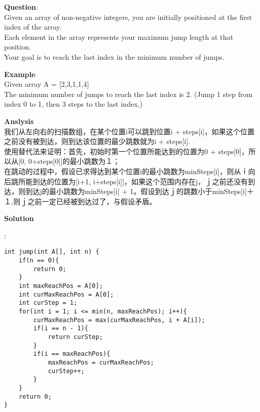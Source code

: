     
\begin{description}
    \item{\textbf{Question}}:\\%
		Given an array of non-negative integers, you are initially positioned at the first index of the array.\\
		Each element in the array represents your maximum jump length at that position.\\
		Your goal is to reach the last index in the minimum number of jumps.\\

    \item{\textbf{Example}}\\
		Given array A = [2,3,1,1,4]\\
		The minimum number of jumps to reach the last index is 2. (Jump 1 step from index 0 to 1, then 3 steps to the last index.)\\

    \item{\textbf{Anslysis}}\\
		我们从左向右的扫描数组，在某个位置i可以跳到位置i + steps[i]，如果这个位置之前没有被到达，则到达该位置的最少跳数就为i + steps[i].\\
		使用替代法来证明：首先，初始时第一个位置所能达到的位置为0 + steps[0]，所以从[0, 0+steps[0]]的最小跳数为１；\\
		在跳动的过程中，假设已求得达到某个位置i的最小跳数为minSteps[i]，则从ｉ向后跳所能到达的位置为[i+1, i+steps[i]]，如果这个范围内存在j，ｊ之前还没有到达，则到达j的最小跳数为minSteps[i] + 1。假设到达ｊ的跳数小于minSteps[i]＋１,则ｊ之前一定已经被到达过了，与假设矛盾。\\

    \item{\textbf{Solution}}\\
	\item{} : \\
		\begin{lstlisting}
int jump(int A[], int n) {
    if(n == 0){
        return 0;
    }
    int maxReachPos = A[0];
    int curMaxReachPos = A[0];
    int curStep = 1;
    for(int i = 1; i <= min(n, maxReachPos); i++){
        curMaxReachPos = max(curMaxReachPos, i + A[i]);
        if(i == n - 1){
            return curStep;
        }
        if(i == maxReachPos){
            maxReachPos = curMaxReachPos;
            curStep++;
        }
    }
    return 0;
}		\end{lstlisting}

\end{description}

